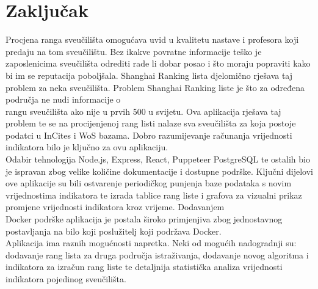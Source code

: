 \documentclass[times, utf8, zavrsni]{fer}
\begin{document}
\chapter{Zaključak}
Procjena ranga sveučilišta omogućava uvid u kvalitetu nastave i profesora koji predaju na tom sveučilištu. Bez ikakve povratne informacije 
teško je zaposlenicima sveučilišta odrediti rade li dobar posao i što moraju popraviti kako bi im se reputacija poboljšala.
Shanghai Ranking lista djelomično rješava taj problem za neka sveučilišta. Problem Shanghai Ranking liste je što za određena područja ne nudi 
informacije o \\rangu sveučilišta ako nije u prvih 500 u svijetu. Ova aplikacija rješava taj problem te se na procijenjenoj rang listi nalaze sva sveučilišta 
za koja postoje podatci u InCites i WoS bazama. Dobro razumijevanje računanja vrijednosti indikatora bilo je ključno za ovu aplikaciju.
\\Odabir tehnologija Node.js, Express, React, Puppeteer PostgreSQL te ostalih bio je ispravan zbog velike količine dokumentacije i dostupne podrške. Ključni dijelovi 
ove aplikacije su bili ostvarenje periodičkog punjenja baze podataka s novim vrijednostima indikatora te izrada tablice rang liste i grafova za vizualni prikaz promjene vrijednosti indikatora kroz vrijeme. 
Dodavanjem \\Docker podrške aplikacija je postala široko primjenjiva zbog jednostavnog postavljanja na bilo koji poslužitelj koji podržava Docker.
\\Aplikacija ima raznih mogućnosti napretka. Neki od mogućih nadogradnji su: dodavanje rang lista za druga područja istraživanja, 
dodavanje novog algoritma i indikatora za izračun rang liste te detaljnija 
statistička analiza vrijednosti indikatora pojedinog sveučilišta.



\nocite{*}
\end{document}
